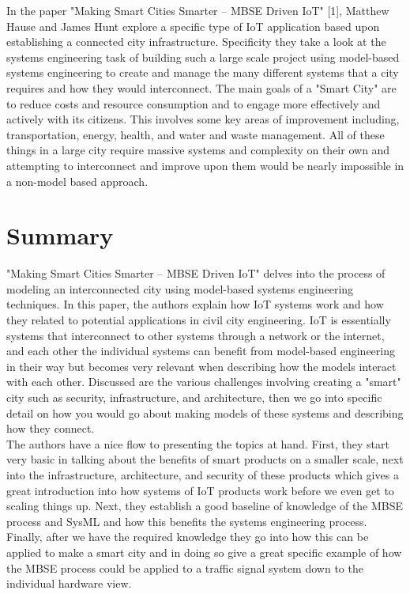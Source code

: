 \documentclass[11pt]{asme2ej}
\begin{document}
In the paper "Making Smart Cities Smarter – MBSE Driven IoT" [1], Matthew Hause and James Hunt explore a specific type of IoT application based upon establishing a connected city infrastructure. 
Specificity they take a look at the systems engineering task of building such a large scale project using model-based systems engineering to create and manage the many different systems that a city requires and how they would interconnect.
The main goals of a "Smart City" are to reduce costs and resource consumption and to engage more effectively and actively with its citizens. This involves some key areas of improvement including, transportation, energy, health, and water and waste management.
All of these things in a large city require massive systems and complexity on their own and attempting to interconnect and improve upon them would be nearly impossible in a non-model based approach. 

\section{Summary}

"Making Smart Cities Smarter – MBSE Driven IoT" delves into the process of modeling an interconnected city using model-based systems engineering techniques. 
In this paper, the authors explain how IoT systems work and how they related to potential applications in civil city engineering.
IoT is essentially systems that interconnect to other systems through a network or the internet, and each other the individual systems can benefit from model-based engineering in their way but becomes very relevant when describing how the models interact with each other.
Discussed are the various challenges involving creating a "smart" city such as security, infrastructure, and architecture, then we go into specific detail on how you would go about making models of these systems and describing how they connect.\\

The authors have a nice flow to presenting the topics at hand. 
First, they start very basic in talking about the benefits of smart products on a smaller scale, next into the infrastructure, architecture, and security of these products which gives a great introduction into how systems of IoT products work before we even get to scaling things up.
Next, they establish a good baseline of knowledge of the MBSE process and SysML and how this benefits the systems engineering process.
Finally, after we have the required knowledge they go into how this can be applied to make a smart city and in doing so give a great specific example of how the MBSE process could be applied to a traffic signal system down to the individual hardware view.\\
\end{document}
